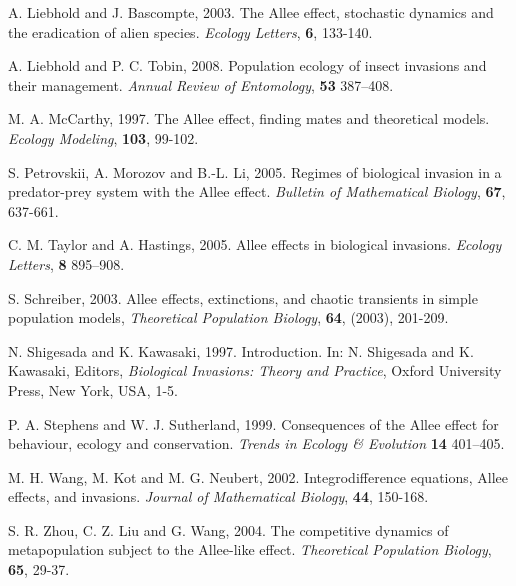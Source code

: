 \begin{thebibliography}{10}
A. Liebhold and J. Bascompte, 2003. The Allee effect, stochastic dynamics and the eradication of alien species. \emph{Ecology Letters}, \textbf{6}, 133-140. 

 A. Liebhold and P. C. Tobin, 2008.
 Population ecology of insect invasions and their management.
\emph{Annual Review of Entomology}, \textbf{53} 387--408.

M. A. McCarthy, 1997. The Allee effect, finding mates and theoretical models. \emph{Ecology Modeling}, \textbf{103}, 99-102.

S. Petrovskii, A. Morozov and B.-L. Li, 2005. Regimes of biological invasion in a predator-prey system with the Allee effect. \emph{Bulletin of Mathematical Biology}, \textbf{67}, 637-661.

 C. M. Taylor and A. Hastings, 2005.
 Allee effects in biological invasions.
\emph{Ecology Letters}, \textbf{8} 895--908.

S. Schreiber, 2003. Allee effects, extinctions, and chaotic transients in simple population models, \emph{Theoretical Population Biology}, \textbf{64}, (2003), 201-209.

N. Shigesada and K. Kawasaki, 1997. Introduction. In: N. Shigesada and K. Kawasaki, Editors, \emph{Biological Invasions: Theory and Practice}, Oxford University Press, New York, USA, 1-5.

 P. A. Stephens and W. J. Sutherland, 1999.
 Consequences of the Allee effect for behaviour, ecology and conservation.
\emph{Trends in Ecology \& Evolution} \textbf{14} 401--405.

M. H. Wang, M. Kot and M. G. Neubert, 2002. Integrodifference equations, Allee effects, and invasions. \emph{Journal of Mathematical Biology}, \textbf{44}, 150-168.

S. R. Zhou, C. Z. Liu and G. Wang, 2004. The competitive dynamics of metapopulation subject to the Allee-like effect. \emph{Theoretical Population Biology}, \textbf{65}, 29-37. 
\end{thebibliography}



